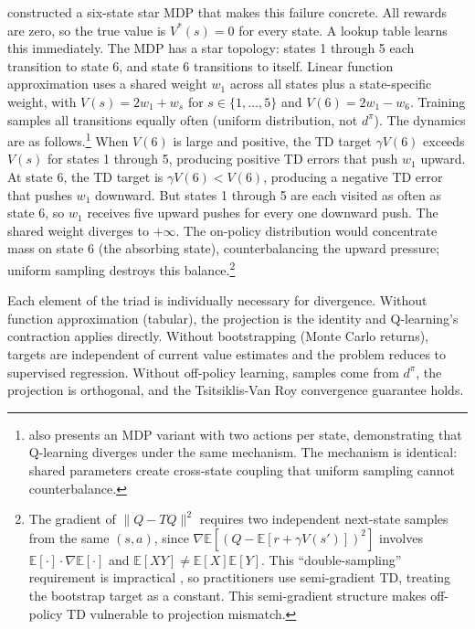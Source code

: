 \citet{Baird1995} constructed a six-state star MDP that makes this failure concrete. All rewards are zero, so the true value is $V^*(s) = 0$ for every state. A lookup table learns this immediately. The MDP has a star topology: states 1 through 5 each transition to state 6, and state 6 transitions to itself. Linear function approximation uses a shared weight $w_1$ across all states plus a state-specific weight, with $V(s) = 2w_1 + w_s$ for $s \in \{1,\ldots,5\}$ and $V(6) = 2w_1 - w_6$. Training samples all transitions equally often (uniform distribution, not $d^\pi$). The dynamics are as follows.\footnote{\citet{Baird1995} also presents an MDP variant with two actions per state, demonstrating that Q-learning diverges under the same mechanism. The mechanism is identical: shared parameters create cross-state coupling that uniform sampling cannot counterbalance.} When $V(6)$ is large and positive, the TD target $\gamma V(6)$ exceeds $V(s)$ for states 1 through 5, producing positive TD errors that push $w_1$ upward. At state 6, the TD target is $\gamma V(6) < V(6)$, producing a negative TD error that pushes $w_1$ downward. But states 1 through 5 are each visited as often as state 6, so $w_1$ receives five upward pushes for every one downward push. The shared weight diverges to $+\infty$. The on-policy distribution would concentrate mass on state 6 (the absorbing state), counterbalancing the upward pressure; uniform sampling destroys this balance.\footnote{The gradient of $\|Q - TQ\|^2$ requires two independent next-state samples from the same $(s,a)$, since $\nabla\mathbb{E}[(Q - \mathbb{E}[r + \gamma V(s')])^2]$ involves $\mathbb{E}[\cdot] \cdot \nabla\mathbb{E}[\cdot]$ and $\mathbb{E}[XY] \neq \mathbb{E}[X]\mathbb{E}[Y]$. This ``double-sampling'' requirement is impractical \citep{Baird1995}, so practitioners use semi-gradient TD, treating the bootstrap target as a constant. This semi-gradient structure makes off-policy TD vulnerable to projection mismatch.}

Each element of the triad is individually necessary for divergence. Without function approximation (tabular), the projection is the identity and Q-learning's contraction applies directly. Without bootstrapping (Monte Carlo returns), targets are independent of current value estimates and the problem reduces to supervised regression. Without off-policy learning, samples come from $d^\pi$, the projection is orthogonal, and the Tsitsiklis-Van Roy convergence guarantee holds.

